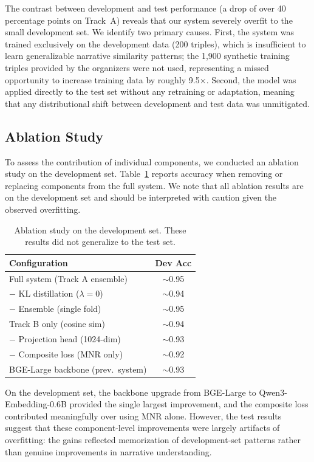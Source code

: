 \documentclass[11pt]{article}
\begin{document}
The contrast between development and test performance (a drop of over 40 percentage points on Track~A) reveals that our system severely overfit to the small development set. We identify two primary causes. First, the system was trained exclusively on the development data (200 triples), which is insufficient to learn generalizable narrative similarity patterns; the 1,900 synthetic training triples provided by the organizers were not used, representing a missed opportunity to increase training data by roughly 9.5$\times$. Second, the model was applied directly to the test set without any retraining or adaptation, meaning that any distributional shift between development and test data was unmitigated.


\subsection{Ablation Study}

To assess the contribution of individual components, we conducted an ablation study on the development set. Table~\ref{tab:ablation} reports accuracy when removing or replacing components from the full system. We note that all ablation results are on the development set and should be interpreted with caution given the observed overfitting.

\begin{table}[ht]
  \centering
  \begin{tabular}{lc}
    \hline
    \textbf{Configuration} & \textbf{Dev Acc} \\
    \hline
    Full system (Track A ensemble)        & $\sim$0.95  \\
    \quad $-$ KL distillation ($\lambda=0$) & $\sim$0.94  \\
    \quad $-$ Ensemble (single fold)       & $\sim$0.95  \\
    Track B only (cosine sim)              & $\sim$0.94  \\
    \quad $-$ Projection head (1024-dim)   & $\sim$0.93  \\
    \quad $-$ Composite loss (MNR only)    & $\sim$0.92  \\
    BGE-Large backbone (prev.\ system)     & $\sim$0.93  \\
    \hline
  \end{tabular}
  \caption{Ablation study on the development set. These results did not generalize to the test set.}
  \label{tab:ablation}
\end{table}

On the development set, the backbone upgrade from BGE-Large to Qwen3-Embedding-0.6B provided the single largest improvement, and the composite loss contributed meaningfully over using MNR alone. However, the test results suggest that these component-level improvements were largely artifacts of overfitting: the gains reflected memorization of development-set patterns rather than genuine improvements in narrative understanding.
\end{document}
